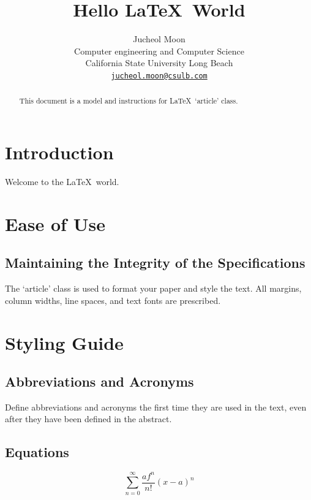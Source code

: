 \documentclass{article}
\begin{document}
\title{Hello \LaTeX\ World}

\author{Jucheol Moon \\ 
\small Computer engineering and Computer Science \\
\small California State University Long Beach \\
\small \texttt{\href{mailto:jucheol.moon@csulb.com}{jucheol.moon@csulb.com}}
}




\date{}

\maketitle

\begin{abstract}
This document is a model and instructions for \LaTeX\  `article' class.
\end{abstract}

\section{Introduction}
Welcome to the \LaTeX\ world.

\section{Ease of Use}

\subsection{Maintaining the Integrity of the Specifications}
The `article' class is used to format your paper and style the text. All margins, column widths, line spaces, and text fonts are prescribed.

\section{Styling Guide}

\subsection{Abbreviations and Acronyms}
Define abbreviations and acronyms the first time they are used in the text, 
even after they have been defined in the abstract.

\subsection{Equations}
\begin{equation}
\sum\limits_{n=0}^\infty \frac {af^n}{n!}{(x-a)^n}
\end{equation}
\end{document}
